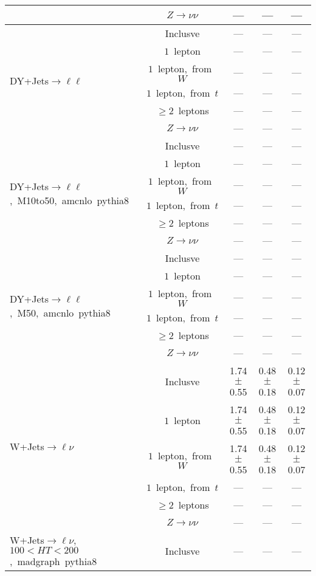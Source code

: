 \documentclass{article}
\begin{document}
\begin{longtable}{|l|c|c|c|c|}
 & $Z\rightarrow\nu\nu$  & ---  & ---  & --- \\* 
\hline 
\multirow{6}{*}{DY+Jets$\rightarrow\ell\ell$} & Inclusve  & ---  & ---  & --- \\* 
 & $1$~lepton  & ---  & ---  & --- \\* 
 & $1$~lepton,~from~$W$  & ---  & ---  & --- \\* 
 & $1$~lepton,~from~$t$  & ---  & ---  & --- \\* 
 & $\ge2$~leptons  & ---  & ---  & --- \\* 
 & $Z\rightarrow\nu\nu$  & ---  & ---  & --- \\* 
\hline 
\multirow{6}{*}{DY+Jets$\rightarrow\ell\ell$,~M10to50,~amcnlo~pythia8} & Inclusve  & ---  & ---  & --- \\* 
 & $1$~lepton  & ---  & ---  & --- \\* 
 & $1$~lepton,~from~$W$  & ---  & ---  & --- \\* 
 & $1$~lepton,~from~$t$  & ---  & ---  & --- \\* 
 & $\ge2$~leptons  & ---  & ---  & --- \\* 
 & $Z\rightarrow\nu\nu$  & ---  & ---  & --- \\* 
\hline 
\multirow{6}{*}{DY+Jets$\rightarrow\ell\ell$,~M50,~amcnlo~pythia8} & Inclusve  & ---  & ---  & --- \\* 
 & $1$~lepton  & ---  & ---  & --- \\* 
 & $1$~lepton,~from~$W$  & ---  & ---  & --- \\* 
 & $1$~lepton,~from~$t$  & ---  & ---  & --- \\* 
 & $\ge2$~leptons  & ---  & ---  & --- \\* 
 & $Z\rightarrow\nu\nu$  & ---  & ---  & --- \\* 
\hline 
\multirow{6}{*}{W+Jets$\rightarrow\ell\nu$} & Inclusve  & 1.74 $\pm$ 0.55  & 0.48 $\pm$ 0.18  & 0.12 $\pm$ 0.07 \\* 
 & $1$~lepton  & 1.74 $\pm$ 0.55  & 0.48 $\pm$ 0.18  & 0.12 $\pm$ 0.07 \\* 
 & $1$~lepton,~from~$W$  & 1.74 $\pm$ 0.55  & 0.48 $\pm$ 0.18  & 0.12 $\pm$ 0.07 \\* 
 & $1$~lepton,~from~$t$  & ---  & ---  & --- \\* 
 & $\ge2$~leptons  & ---  & ---  & --- \\* 
 & $Z\rightarrow\nu\nu$  & ---  & ---  & --- \\* 
\hline 
\multirow{6}{*}{W+Jets$\rightarrow\ell\nu$,~$100<HT<200$,~madgraph~pythia8} & Inclusve  & ---  & ---  & --- \\* 

\end{longtable}
\end{document}
